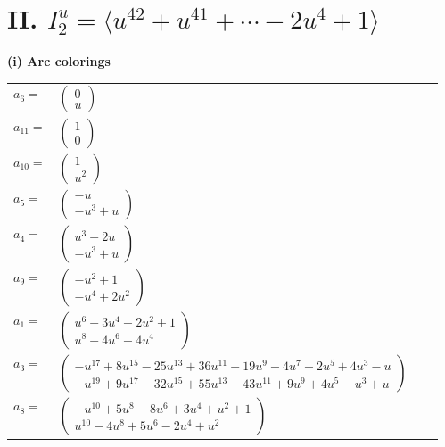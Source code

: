 \documentclass[1p]{elsarticle_modified}
\theoremstyle{definition}
\begin{document}
\centering \section*{II. $I^u_{2}= \langle u^{42}+u^{41}+\cdots-2 u^4+1 \rangle$}
\flushleft \textbf{(i) Arc colorings}\\
\begin{tabular}{m{7pt} m{180pt} m{7pt} m{180pt} }
\flushright $a_{6}=$&$\begin{pmatrix}0\\u\end{pmatrix}$ \\
\flushright $a_{11}=$&$\begin{pmatrix}1\\0\end{pmatrix}$ \\
\flushright $a_{10}=$&$\begin{pmatrix}1\\u^2\end{pmatrix}$ \\
\flushright $a_{5}=$&$\begin{pmatrix}- u\\- u^3+u\end{pmatrix}$ \\
\flushright $a_{4}=$&$\begin{pmatrix}u^3-2 u\\- u^3+u\end{pmatrix}$ \\
\flushright $a_{9}=$&$\begin{pmatrix}- u^2+1\\- u^4+2 u^2\end{pmatrix}$ \\
\flushright $a_{1}=$&$\begin{pmatrix}u^6-3 u^4+2 u^2+1\\u^8-4 u^6+4 u^4\end{pmatrix}$ \\
\flushright $a_{3}=$&$\begin{pmatrix}- u^{17}+8 u^{15}-25 u^{13}+36 u^{11}-19 u^9-4 u^7+2 u^5+4 u^3- u\\- u^{19}+9 u^{17}-32 u^{15}+55 u^{13}-43 u^{11}+9 u^9+4 u^5- u^3+u\end{pmatrix}$ \\
\flushright $a_{8}=$&$\begin{pmatrix}- u^{10}+5 u^8-8 u^6+3 u^4+u^2+1\\u^{10}-4 u^8+5 u^6-2 u^4+u^2\end{pmatrix}$ \\

\end{tabular}
\end{document}
